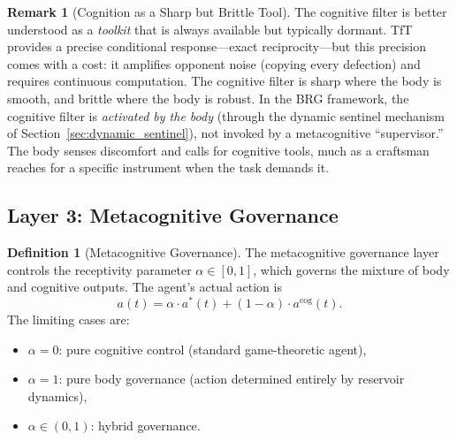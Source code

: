 \documentclass[11pt,a4paper]{article}
\theoremstyle{definition}
\newtheorem{definition}[theorem]{Definition}
\newtheorem{remark}[theorem]{Remark}
\newcommand{\acog}{a^{\mathrm{cog}}}
\newcommand{\abody}{a^{*}}
\begin{document}
\begin{remark}[Cognition as a Sharp but Brittle Tool]
The cognitive filter is better understood as a \emph{toolkit} that is always
available but typically dormant.  TfT provides a precise conditional
response---exact reciprocity---but this precision comes with a cost:
it amplifies opponent noise (copying every defection) and requires
continuous computation.  The cognitive filter is sharp where the body is
smooth, and brittle where the body is robust.
In the BRG framework, the cognitive filter is \emph{activated by the body}
(through the dynamic sentinel mechanism of Section~\ref{sec:dynamic_sentinel}),
not invoked by a metacognitive ``supervisor.''
The body senses discomfort and calls for cognitive tools, much as a
craftsman reaches for a specific instrument when the task demands it.
\end{remark}

\subsection{Layer 3: Metacognitive Governance}

\begin{definition}[Metacognitive Governance]
\label{def:metacognition}
The metacognitive governance layer controls the receptivity parameter
$\alpha \in [0,1]$, which governs the mixture of body and cognitive outputs.
The agent's actual action is
\begin{equation}
\label{eq:mixture}
a(t) = \alpha \cdot \abody(t) + (1 - \alpha) \cdot \acog(t).
\end{equation}
The limiting cases are:
\begin{itemize}[nosep]
  \item $\alpha = 0$: pure cognitive control (standard game-theoretic agent),
  \item $\alpha = 1$: pure body governance (action determined entirely by
    reservoir dynamics),
  \item $\alpha \in (0,1)$: hybrid governance.
\end{itemize}
\end{definition}
\end{document}
